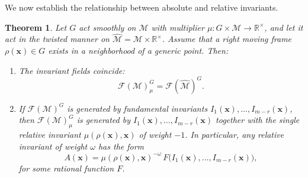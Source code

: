 \documentclass[12pt,reqno]{amsart}
\newtheorem{theorem}{Theorem}
\begin{document}
\medskip

We now establish the relationship between absolute and relative invariants.

\begin{theorem}\label{gt}
Let $G$ act smoothly on $\mathcal M$ with multiplier $\mu : G \times \mathcal M \to \mathbb{R}^\times$,
and let it act in the twisted manner on $\widehat{\mathcal M} = \mathcal M \times \mathbb{R}^\times$.
Assume that a right moving frame $\rho( \boldsymbol x) \in G$ exists in a neighborhood of a generic point.
Then:
\begin{enumerate}
\item[(i)] The invariant fields coincide:
\[
\mathcal F(\mathcal M)^G_\mu = \mathcal F(\widehat{\mathcal M})^G.
\]
\item[(ii)] If $\mathcal F(\mathcal M)^G$ is generated by fundamental invariants
$I_1(\boldsymbol x),\dots,I_{m-r}(\boldsymbol x)$, then
$\mathcal F(\mathcal M)^G_\mu$ is generated by
$I_1(\boldsymbol x),\dots,I_{m-r}(\boldsymbol x)$ together with the single relative invariant
$\mu(\rho(\boldsymbol x),\boldsymbol x)$ of weight $-1$.
In particular, any relative invariant of weight $\omega$ has the form
\[
A(\boldsymbol x)
=
\mu(\rho(\boldsymbol x),\boldsymbol x)^{-\omega}\,
F\bigl(I_1(\boldsymbol x),\dots,I_{m-r}(\boldsymbol x)\bigr),
\]
for some rational function $F$.
\end{enumerate}
\end{theorem}
\end{document}
